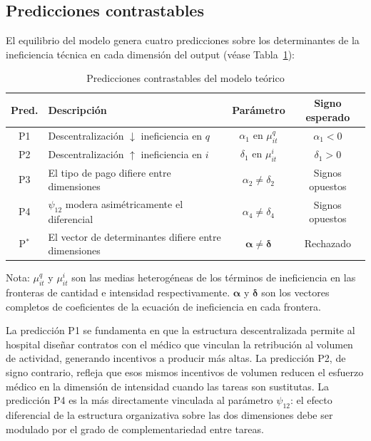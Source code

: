 \documentclass[12pt, a4paper]{article}
\newcommand{\bsym}[1]{\boldsymbol{#1}}
\begin{document}
\subsection{Predicciones contrastables}

El equilibrio del modelo genera cuatro predicciones
sobre los determinantes de la ineficiencia técnica en
cada dimensión del output (véase Tabla~\ref{tab:predicciones}):

\begin{table}[h!]
\centering
\caption{Predicciones contrastables del modelo teórico}
\label{tab:predicciones}
\begin{threeparttable}
\begin{tabular}{clcc}
\toprule
\textbf{Pred.} & \textbf{Descripción} &
\textbf{Parámetro} & \textbf{Signo esperado} \\
\midrule
P1 & Descentralización $\downarrow$ ineficiencia en $q$
   & $\alpha_1$ en $\mu^q_{it}$ & $\alpha_1 < 0$ \\
P2 & Descentralización $\uparrow$ ineficiencia en $i$
   & $\delta_1$ en $\mu^i_{it}$ & $\delta_1 > 0$ \\
P3 & El tipo de pago difiere entre dimensiones
   & $\alpha_2 \neq \delta_2$ & Signos opuestos \\
P4 & $\psi_{12}$ modera asimétricamente el diferencial
   & $\alpha_4 \neq \delta_4$ & Signos opuestos \\
P$^*$ & El vector de determinantes difiere entre
         dimensiones & $\bsym{\alpha} \neq \bsym{\delta}$
       & Rechazado \\
\bottomrule
\end{tabular}
\begin{tablenotes}
  \small
  \item Nota: $\mu^q_{it}$ y $\mu^i_{it}$ son las medias
    heterogéneas de los términos de ineficiencia en las
    fronteras de cantidad e intensidad respectivamente.
    $\bsym{\alpha}$ y $\bsym{\delta}$ son los vectores
    completos de coeficientes de la ecuación de
    ineficiencia en cada frontera.
\end{tablenotes}
\end{threeparttable}
\end{table}

La predicción P1 se fundamenta en que la estructura
descentralizada permite al hospital diseñar contratos
con el médico que vinculan la retribución al volumen de
actividad, generando incentivos a producir más altas.
La predicción P2, de signo contrario, refleja que esos
mismos incentivos de volumen reducen el esfuerzo médico
en la dimensión de intensidad cuando las tareas son
sustitutas. La predicción P4 es la más directamente
vinculada al parámetro $\psi_{12}$: el efecto diferencial
de la estructura organizativa sobre las dos dimensiones
debe ser modulado por el grado de complementariedad
entre tareas.
\end{document}
